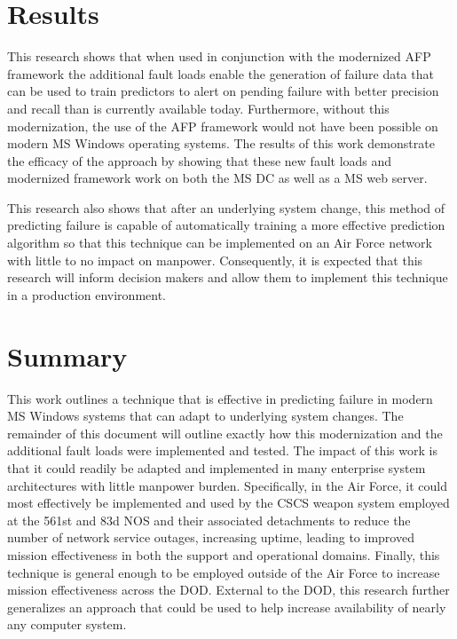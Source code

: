 \section{Results}
This research shows that when used in conjunction with the modernized \ac{AFP}
framework the additional fault loads enable the generation of failure data that
can be used to train predictors to alert on pending failure with better
precision and recall than is currently available today.  Furthermore, without
this modernization, the use of the \ac{AFP} framework would not have been
possible on modern \ac{MS} Windows operating systems.  The results of this work
demonstrate the efficacy of the approach by showing that these new fault loads
and modernized framework work on both the \ac{MS} \ac{DC} as well as a \ac{MS}
web server.

This research also shows that after an underlying system change, this
method of predicting failure is capable of automatically training a more
effective prediction algorithm so that this technique can be implemented on an
Air Force network with little to no impact on manpower.  Consequently, it is
expected that this research will inform decision makers and allow them to
implement this technique in a production environment.

\section{Summary}
This work outlines a technique that is effective in predicting failure in
modern \ac{MS} Windows systems that can adapt to underlying system changes.
The remainder of this document will outline exactly how this modernization and
the additional fault loads were implemented and tested.  The impact of this
work is that it could readily be adapted and implemented in many enterprise
system architectures with little manpower burden.  Specifically, in the Air
Force, it could most effectively be implemented and used by the \ac{CSCS}
weapon system employed at the 561st and 83d \ac{NOS} and their associated
detachments to reduce the number of network service outages, increasing uptime,
leading to improved mission effectiveness in both the support and operational
domains.  Finally, this technique is general enough to be employed outside of
the Air Force to increase mission effectiveness across the \ac{DOD}.  External
to the \ac{DOD}, this research further generalizes an approach that could be
used to help increase availability of nearly any computer system.
